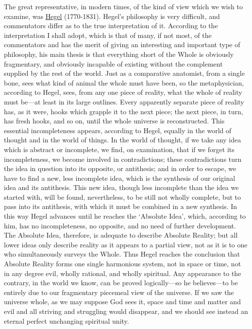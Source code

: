\documentclass[oneside,letterpaper,12pt]{book}
\begin{document}
The great representative, in modern times, of the kind of view which we
wish to examine, was \href{https://plato.stanford.edu/entries/hegel/}{Hegel} (1770-1831). \label{hegel} Hegel's
philosophy is very difficult, and commentators differ as to the true
interpretation of it. According to the interpretation I shall adopt,
which is that of many, if not most, of the commentators and has the
merit of giving an interesting and important type of philosophy, his
main thesis is that everything short of the Whole is obviously
fragmentary, and obviously incapable of existing without the complement
supplied by the rest of the world. Just as a comparative anatomist, from
a single bone, sees what kind of animal the whole must have been, so the
metaphysician, according to Hegel, sees, from any one piece of reality,
what the whole of reality must be---at least in its large outlines.
Every apparently separate piece of reality has, as it were, hooks which
grapple it to the next piece; the next piece, in turn, has fresh hooks,
and so on, until the whole universe is reconstructed. This essential
incompleteness appears, according to Hegel, equally in the world of
thought and in the world of things. In the world of thought, if we take
any idea which is abstract or incomplete, we find, on examination, that
if we forget its incompleteness, we become involved in contradictions;
these contradictions turn the idea in question into its opposite, or
antithesis; and in order to escape, we have to find a new, less
incomplete idea, which is the synthesis of our original idea and its
antithesis. This new idea, though less incomplete than the idea we
started with, will be found, nevertheless, to be still not wholly
complete, but to pass into its antithesis, with which it must be
combined in a new synthesis. In this way Hegel advances until he reaches
the `Absolute Idea', which, according to
him, has no incompleteness, no opposite, and no need of further
development. The Absolute Idea, therefore, is adequate to describe
Absolute Reality; but all lower ideas only describe reality as it
appears to a partial view, not as it is to one who simultaneously
surveys the Whole. \label{harmonious} Thus Hegel reaches the conclusion that Absolute
Reality forms one single harmonious system, not in space or time, not in
any degree evil, wholly rational, and wholly spiritual. Any appearance
to the contrary, in the world we know, can be proved logically---so he
believes---to be entirely due to our fragmentary piecemeal view of the
universe. If we saw the universe whole, as we may suppose God sees it,
space and time and matter and evil and all striving and struggling would
disappear, and we should see instead an eternal perfect unchanging
spiritual unity.
\end{document}
